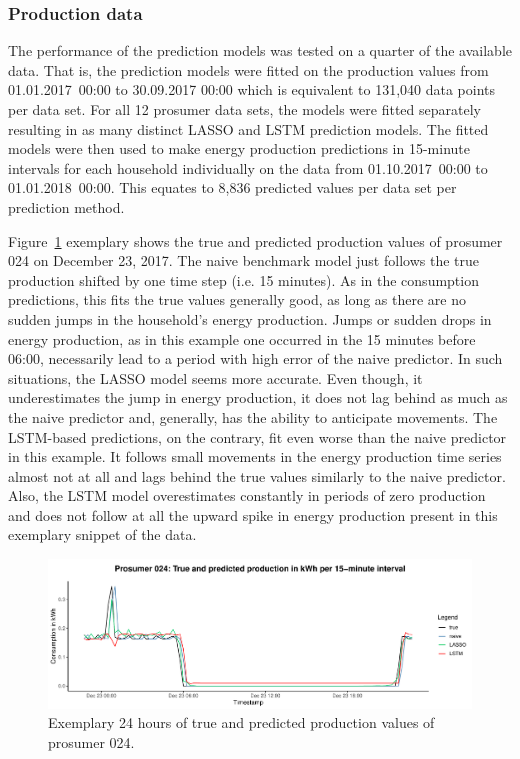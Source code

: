 \subsubsection{Production data}

The performance of the prediction models was tested on a quarter of the available data. That is, the prediction models were fitted on the production values from 01.01.2017~00:00 to 30.09.2017 00:00 which is equivalent to 131,040 data points per data set. For all 12 prosumer data sets, the models were fitted separately resulting in as many distinct LASSO and LSTM prediction models. The fitted models were then used to make energy production predictions in 15-minute intervals for each household individually on the data from 01.10.2017~00:00 to 01.01.2018~00:00. This equates to 8,836 predicted values per data set per prediction method.

Figure~\ref{Fig:glimpse_predprod} exemplary shows the true and predicted production values of prosumer 024 on December 23, 2017. The naive benchmark model just follows the true production shifted by one time step (i.e. 15 minutes). As in the consumption predictions, this fits the true values generally good, as long as there are no sudden jumps in the household's energy production. Jumps or sudden drops in energy production, as in this example one occurred in the 15 minutes before 06:00, necessarily lead to a period with high error of the naive predictor. In such situations, the LASSO model seems more accurate. Even though, it underestimates the jump in energy production, it does not lag behind as much as the naive predictor and, generally, has the ability to anticipate movements. The LSTM-based predictions, on the contrary, fit even worse than the naive predictor in this example. It follows small movements in the energy production time series almost not at all and lags behind the true values similarly to the naive predictor. Also, the LSTM model overestimates constantly in periods of zero production and does not follow at all the upward spike in energy production present in this exemplary snippet of the data.
%
\begin{figure}[htbp]
    \centering
    \includegraphics[width=\textwidth]{thesis/graphs/evaluation/p024_pred_prod.pdf}
    \caption[Exemplary 24 hours of true and predicted production values]{Exemplary 24 hours of true and predicted production values of prosumer 024. \quantnet\href{}{}}
    \label{Fig:glimpse_predprod}
\end{figure}
%

